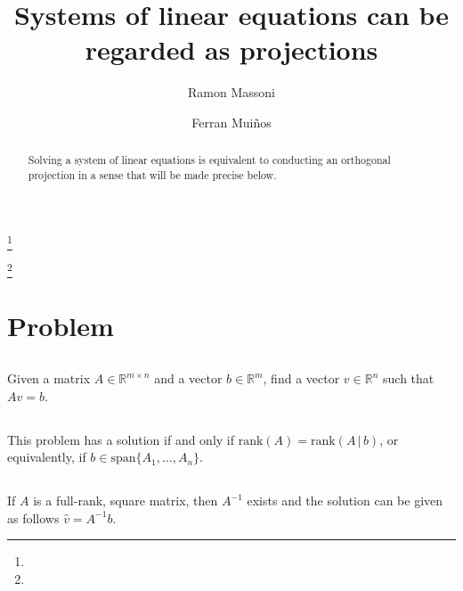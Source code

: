 \documentclass{proc-l}
\theoremstyle{definition}
\theoremstyle{remark}
\numberwithin{equation}{section}
\newcommand{\R}{\mathbb{R}}
\newcommand{\rank}[1]{\textrm{rank}({#1})}
\newcommand{\x}{\times}
\begin{document}
\title{Systems of linear equations can be regarded as projections}


\author{Ramon Massoni}
\address{}
\curraddr{}
\email{}
\thanks{}

\author{Ferran Mui\~nos}
\address{}
\curraddr{}
\email{}
\thanks{}





\begin{abstract}
Solving a system of linear equations is equivalent to conducting an orthogonal projection in a sense that will be made precise below.
\end{abstract}

\maketitle

\section{Problem}

\subsection{}
Given a matrix $A\in \R^{m \x n}$ and a vector $b\in \R^m$, find a vector $v\in\R^n$ such that $Av=b$.

\subsection{} 
This problem has a solution if and only if $\rank{A} = \rank{A\,|\,b}$, or equivalently, if $b \in \textrm{span}\{A_1, \ldots, A_n\}$.

\subsection{} 
If $A$ is a full-rank, square matrix, then $A^{-1}$ exists and the solution can be given as follows $\hat{v} = A^{-1}b$.
\end{document}
